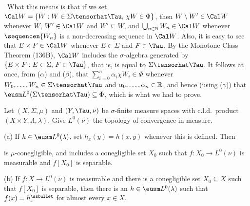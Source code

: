 {\medskip

\quad\grheadd\ What this means is that if we set
$\Cal W=\{W:W\in\Sigma\tensorhat\Tau,\,\chi W\in\Phi\}$, then
$W\setminus W'\in\Cal W$ whenever $W$, $W'\in\Cal W$ and
$W'\subseteq W$, and
$\bigcup_{n\in\Bbb N}W_n\in\Cal W$ whenever $\sequencen{W_n}$ is a
non-decreasing sequence in $\Cal W$.   Also, it is easy to see that
$E\times F\in\Cal W$ whenever $E\in\Sigma$ and $F\in\Tau$.   By the
Monotone Class Theorem (136B), $\Cal W$ includes the $\sigma$-algebra
generated by $\{E\times F:E\in\Sigma,\,F\in\Tau\}$, that is, is equal to
$\Sigma\tensorhat\Tau$.   It follows at once, from ($\alpha$) and
($\beta$), that $\sum_{i=0}^n\alpha_i\chi W_i\in\Phi$ whenever
$W_0,\ldots,W_n\in\Sigma\tensorhat\Tau$ and
$\alpha_0,\ldots,\alpha_n\in\Bbb R$, and hence (using ($\gamma$)) that
$\eusm L^0(\Sigma\tensorhat\Tau)\subseteq\Phi$, which is what we had to
prove.
}%

 Let $(X,\Sigma,\mu)$ and $(Y,\Tau,\nu)$ be
$\sigma$-finite measure spaces with c.l.d.\ product
$(X\times Y,\Lambda,\lambda)$.   Give $L^0(\nu)$ the topology of
convergence in measure.   

(a) If $h\in\eusm L^0(\lambda)$, set $h_x(y)=h(x,y)$ whenever this is
defined.   Then


\noindent is $\mu$-conegligible, and includes a conegligible set $X_0$
such that $f:X_0\to L^0(\nu)$ is measurable and $f[X_0]$ is separable.

(b) If $f:X\to L^0(\nu)$ is measurable and there is a conegligible set
$X_0\subseteq X$ such that $f[X_0]$ is separable, then there is an
$h\in\eusm L^0(\lambda)$ such that $f(x)=h_x^{\ssbullet}$ for almost
every $x\in X$.


